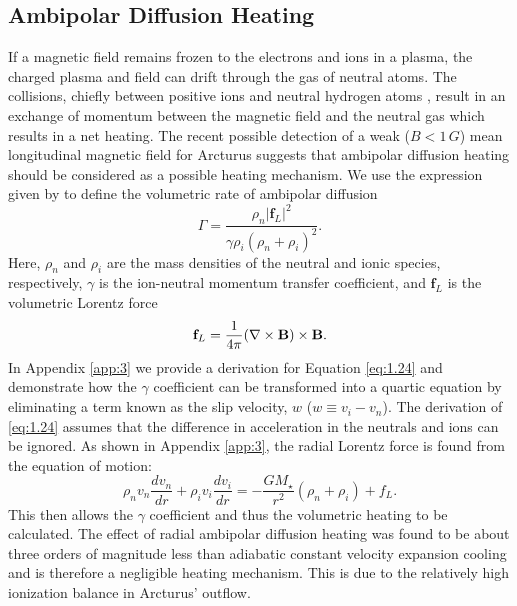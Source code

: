 \subsection{Ambipolar Diffusion Heating}\label{sec:7.4.2}
If a magnetic field remains frozen to the electrons and ions in a plasma, the charged plasma and field can drift through the gas of neutral atoms. The collisions, chiefly between positive ions and neutral hydrogen atoms \citep{spitzer_1978}, result in an exchange of momentum between the magnetic field and the neutral gas which results in a net heating. The recent possible detection of a weak ($B < 1\,G$) mean longitudinal magnetic field for Arcturus \citep{Sennhauser_2011} suggests that ambipolar diffusion heating should be considered as a possible heating mechanism.  We use the expression given by \cite{shang_2002} to define the volumetric rate of ambipolar  diffusion 
\begin{equation}\label{eq:1.24}
\Gamma = \frac{\rho _{n}|\mathbf{f}_{L}|^2}{\gamma \rho _{i}(\rho _{n}+\rho _{i})^2}.
\end{equation}
Here, $\rho _{n}$ and $\rho _{i}$ are the mass densities of the neutral and ionic species, respectively, $\gamma$ is the ion-neutral momentum transfer coefficient, and $\textbf{f}_{L}$ is the volumetric Lorentz force
\begin{equation}
\textbf{f}_{L}=\frac{1}{4\pi}({\bf \nabla } \times \textbf{B})\times \textbf{B}.
\end{equation}
In Appendix \ref{app:3} we provide a derivation for Equation \ref{eq:1.24} and demonstrate how the $\gamma$ coefficient can be transformed into a quartic equation by eliminating a term known as the slip velocity, $w$ ($w\equiv v_{i}-v_{n}$). The derivation of \ref{eq:1.24} assumes that the difference in acceleration in the neutrals and ions can be ignored. As shown in Appendix \ref{app:3}, the radial Lorentz force is found from the equation of motion:
\begin{equation}
\rho _{n}v_{n}\frac{dv_{n}}{dr}+\rho _{i}v_{i}\frac{dv_{i}}{dr}=-\frac{GM_{\star}}{r^2}(\rho _{n} + \rho _{i})+f_{L}.
\end{equation}
This then allows the $\gamma$ coefficient and thus the volumetric heating to be calculated. The effect of radial ambipolar diffusion heating was found to be about three orders of magnitude less than adiabatic constant velocity expansion cooling and is therefore a negligible heating mechanism. This is due to the relatively high ionization balance in Arcturus' outflow.

